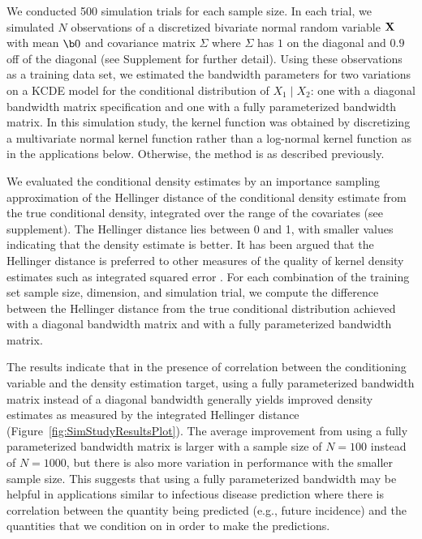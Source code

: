 \documentclass[times, doublespace]{simauth}\usepackage[]{graphicx}\usepackage[]{color}
\begin{document}

We conducted 500 simulation trials for each sample size.
In each trial, we simulated $N$ observations of
a discretized bivariate normal random variable ${\bf X}$ with mean $\b0$ and
covariance matrix $\Sigma$ where $\Sigma$ has $1$ on
the diagonal and $0.9$ off of the diagonal (see Supplement for further detail).
Using these observations as a training data set, we estimated the bandwidth
parameters for two variations on a KCDE model for the conditional distribution
of $X_1 \mid X_2$: one with a diagonal bandwidth matrix specification
and one with a fully parameterized bandwidth matrix.  In this simulation study,
the kernel function was obtained by discretizing a multivariate normal kernel
function rather than a log-normal kernel function as in the applications below.
Otherwise, the method is as described previously.

We evaluated the conditional density estimates by an importance
sampling approximation of the Hellinger distance of the conditional
density estimate from the true conditional density, integrated over the range of
the covariates (see supplement).
The Hellinger distance lies between 0 and 1, with smaller values indicating that the
density estimate is better.  It has been argued that the Hellinger distance is
preferred to other measures of the quality of kernel density estimates such as
integrated squared error \cite{kanazawa1993hellingerDistanceKDE}. For each
combination of the training set sample size, dimension, and simulation trial, we
compute the difference between the Hellinger distance from the true conditional
distribution achieved with a diagonal bandwidth matrix and with a fully parameterized bandwidth matrix.

The results indicate that in the presence of correlation between the
conditioning variable and the density estimation target, using a fully
parameterized bandwidth matrix instead of a diagonal bandwidth generally yields improved
density estimates as measured by the integrated Hellinger distance (Figure~\ref{fig:SimStudyResultsPlot}).
The average improvement from using a fully parameterized bandwidth matrix
is larger with a sample size of $N = 100$ instead of $N = 1000$, but there is
also more variation in performance with the smaller sample size.  This suggests
that using a fully parameterized bandwidth may be helpful in applications
similar to infectious disease prediction where there is correlation between the
quantity being predicted (e.g., future incidence) and the quantities that we
condition on in order to make the predictions.
\end{document}
